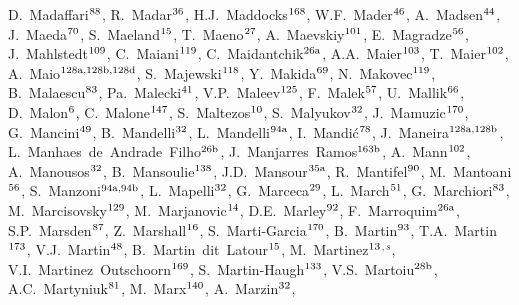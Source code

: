 \begin{flushleft}
D.~Madaffari$^\textrm{\scriptsize 88}$,
R.~Madar$^\textrm{\scriptsize 36}$,
H.J.~Maddocks$^\textrm{\scriptsize 168}$,
W.F.~Mader$^\textrm{\scriptsize 46}$,
A.~Madsen$^\textrm{\scriptsize 44}$,
J.~Maeda$^\textrm{\scriptsize 70}$,
S.~Maeland$^\textrm{\scriptsize 15}$,
T.~Maeno$^\textrm{\scriptsize 27}$,
A.~Maevskiy$^\textrm{\scriptsize 101}$,
E.~Magradze$^\textrm{\scriptsize 56}$,
J.~Mahlstedt$^\textrm{\scriptsize 109}$,
C.~Maiani$^\textrm{\scriptsize 119}$,
C.~Maidantchik$^\textrm{\scriptsize 26a}$,
A.A.~Maier$^\textrm{\scriptsize 103}$,
T.~Maier$^\textrm{\scriptsize 102}$,
A.~Maio$^\textrm{\scriptsize 128a,128b,128d}$,
S.~Majewski$^\textrm{\scriptsize 118}$,
Y.~Makida$^\textrm{\scriptsize 69}$,
N.~Makovec$^\textrm{\scriptsize 119}$,
B.~Malaescu$^\textrm{\scriptsize 83}$,
Pa.~Malecki$^\textrm{\scriptsize 41}$,
V.P.~Maleev$^\textrm{\scriptsize 125}$,
F.~Malek$^\textrm{\scriptsize 57}$,
U.~Mallik$^\textrm{\scriptsize 66}$,
D.~Malon$^\textrm{\scriptsize 6}$,
C.~Malone$^\textrm{\scriptsize 147}$,
S.~Maltezos$^\textrm{\scriptsize 10}$,
S.~Malyukov$^\textrm{\scriptsize 32}$,
J.~Mamuzic$^\textrm{\scriptsize 170}$,
G.~Mancini$^\textrm{\scriptsize 49}$,
B.~Mandelli$^\textrm{\scriptsize 32}$,
L.~Mandelli$^\textrm{\scriptsize 94a}$,
I.~Mandi\'{c}$^\textrm{\scriptsize 78}$,
J.~Maneira$^\textrm{\scriptsize 128a,128b}$,
L.~Manhaes~de~Andrade~Filho$^\textrm{\scriptsize 26b}$,
J.~Manjarres~Ramos$^\textrm{\scriptsize 163b}$,
A.~Mann$^\textrm{\scriptsize 102}$,
A.~Manousos$^\textrm{\scriptsize 32}$,
B.~Mansoulie$^\textrm{\scriptsize 138}$,
J.D.~Mansour$^\textrm{\scriptsize 35a}$,
R.~Mantifel$^\textrm{\scriptsize 90}$,
M.~Mantoani$^\textrm{\scriptsize 56}$,
S.~Manzoni$^\textrm{\scriptsize 94a,94b}$,
L.~Mapelli$^\textrm{\scriptsize 32}$,
G.~Marceca$^\textrm{\scriptsize 29}$,
L.~March$^\textrm{\scriptsize 51}$,
G.~Marchiori$^\textrm{\scriptsize 83}$,
M.~Marcisovsky$^\textrm{\scriptsize 129}$,
M.~Marjanovic$^\textrm{\scriptsize 14}$,
D.E.~Marley$^\textrm{\scriptsize 92}$,
F.~Marroquim$^\textrm{\scriptsize 26a}$,
S.P.~Marsden$^\textrm{\scriptsize 87}$,
Z.~Marshall$^\textrm{\scriptsize 16}$,
S.~Marti-Garcia$^\textrm{\scriptsize 170}$,
B.~Martin$^\textrm{\scriptsize 93}$,
T.A.~Martin$^\textrm{\scriptsize 173}$,
V.J.~Martin$^\textrm{\scriptsize 48}$,
B.~Martin~dit~Latour$^\textrm{\scriptsize 15}$,
M.~Martinez$^\textrm{\scriptsize 13}$$^{,s}$,
V.I.~Martinez~Outschoorn$^\textrm{\scriptsize 169}$,
S.~Martin-Haugh$^\textrm{\scriptsize 133}$,
V.S.~Martoiu$^\textrm{\scriptsize 28b}$,
A.C.~Martyniuk$^\textrm{\scriptsize 81}$,
M.~Marx$^\textrm{\scriptsize 140}$,
A.~Marzin$^\textrm{\scriptsize 32}$,
$$
\end{flushleft}
